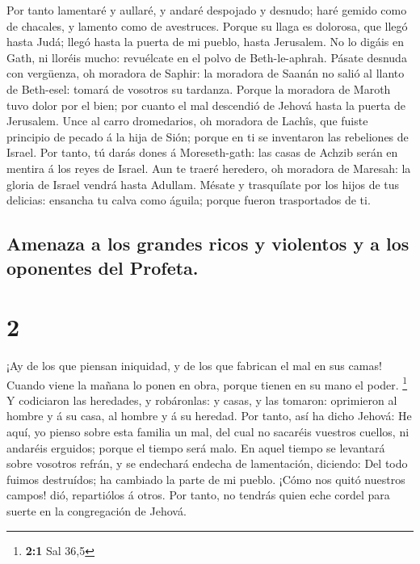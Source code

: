 Por tanto lamentaré y aullaré, y andaré despojado y
desnudo; haré gemido como de chacales, y lamento como de avestruces.
 Porque su llaga es dolorosa, que llegó hasta Judá; llegó
hasta la puerta de mi pueblo, hasta Jerusalem.  No lo
digáis en Gath, ni lloréis mucho: revuélcate en el polvo de
Beth-le-aphrah.  Pásate desnuda con vergüenza, oh moradora
de Saphir: la moradora de Saanán no salió al llanto de Beth-esel: tomará
de vosotros su tardanza.  Porque la moradora de Maroth tuvo
dolor por el bien; por cuanto el mal descendió de Jehová hasta la puerta
de Jerusalem.  Unce al carro dromedarios, oh moradora de
Lachîs, que fuiste principio de pecado á la hija de Sión; porque en ti
se inventaron las rebeliones de Israel.  Por tanto, tú
darás dones á Moreseth-gath: las casas de Achzib serán en mentira á los
reyes de Israel.  Aun te traeré heredero, oh moradora de
Maresah: la gloria de Israel vendrá hasta Adullam.  Mésate
y trasquílate por los hijos de tus delicias: ensancha tu calva como
águila; porque fueron trasportados de ti.

\hypertarget{amenaza-a-los-grandes-ricos-y-violentos-y-a-los-oponentes-del-profeta.}{%
\subsection{Amenaza a los grandes ricos y violentos y a los oponentes
del
Profeta.}\label{amenaza-a-los-grandes-ricos-y-violentos-y-a-los-oponentes-del-profeta.}}

\hypertarget{section-1}{%
\section{2}\label{section-1}}

 ¡Ay de los que piensan iniquidad, y de los que fabrican el
mal en sus camas! Cuando viene la mañana lo ponen en obra, porque tienen
en su mano el poder. \footnote{\textbf{2:1} Sal 36,5}  Y
codiciaron las heredades, y robáronlas: y casas, y las tomaron:
oprimieron al hombre y á su casa, al hombre y á su heredad. 
Por tanto, así ha dicho Jehová: He aquí, yo pienso sobre esta familia un
mal, del cual no sacaréis vuestros cuellos, ni andaréis erguidos; porque
el tiempo será malo.  En aquel tiempo se levantará sobre
vosotros refrán, y se endechará endecha de lamentación, diciendo: Del
todo fuimos destruídos; ha cambiado la parte de mi pueblo. ¡Cómo nos
quitó nuestros campos! dió, repartiólos á otros.  Por tanto,
no tendrás quien eche cordel para suerte en la congregación de Jehová.

